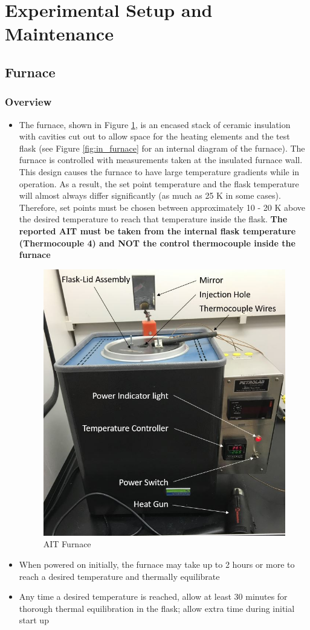 \documentclass[letterpaper,11pt]{article}
\begin{document}
\section{Experimental Setup and Maintenance}
    \subsection{Furnace}
        \subsubsection{Overview}
    \begin{itemize}
    \item The furnace, shown in Figure \ref{fig:furnace_pic}, is an encased 
        stack of ceramic insulation with cavities 
        cut out to allow space for the heating elements and the test flask
        (see Figure \ref{fig:in_furnace} for an internal diagram of the 
        furnace). The furnace is controlled with measurements taken at the 
        insulated furnace wall. This design causes the furnace to have
        large temperature gradients while in operation. As a result, the 
        set point temperature and the flask temperature will almost always 
        differ significantly (as much as 25 K in some cases). Therefore, 
        set points must be chosen between approximately 10 - 20 K above the 
        desired temperature to reach that temperature inside the flask.
        \textbf{The reported AIT must be taken from the internal flask 
        temperature (Thermocouple 4) and NOT the control thermocouple inside
        the furnace}
    
    \begin{figure}[H]
    \centering
    \includegraphics[width=.45\textwidth]{Furnace_pic_diagram.jpg}
    \caption{AIT Furnace}
    \label{fig:furnace_pic}
    \end{figure}
    
    \item When powered on initially, the furnace may take up to 2 hours or more  
        to reach a desired temperature and thermally equilibrate
    \item Any time a desired temperature is reached, allow at least 30 
        minutes for thorough thermal equilibration in the flask; allow extra 
        time during initial start up
     
     \end{itemize}
\end{document}
